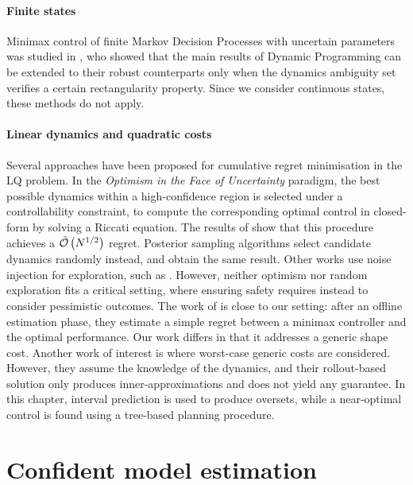 \paragraph{Finite states} Minimax control of finite Markov Decision Processes with uncertain parameters was studied in \citep{Iyengar2005,Nilim2005,Wiesemann2013}, who showed that the main results of Dynamic Programming can be extended to their robust counterparts only when the dynamics ambiguity set verifies a certain rectangularity property. Since we consider continuous states, these methods do not apply.

\paragraph{Linear dynamics and quadratic costs} Several approaches have been proposed for cumulative regret minimisation in the LQ problem. In the \emph{Optimism in the Face of Uncertainty} paradigm, the best possible dynamics within a high-confidence region is selected under a controllability constraint, to compute the corresponding optimal control in closed-form by solving a Riccati equation. The results of 	\citep{abbasi-yadkori11a,Ibrahimi2013,Faradonbeh2020} show that this procedure achieves a $\tilde{\mathcal{O}}\left(N^{1/2}\right)$ regret. Posterior sampling algorithms \citep{Ouyang2017,abeille18a} select candidate dynamics randomly instead, and obtain the same result. Other works use noise injection for exploration, such as \citep{Dean2019,Dean2018}. However, neither optimism nor random exploration fits a critical setting, where ensuring safety requires instead to consider pessimistic outcomes. The work of \citet{Dean2019} is close to our setting: after an offline estimation phase, they estimate a simple regret between a minimax controller and the optimal performance. Our work differs in that it addresses a generic shape cost. 
Another work of interest is \citep{Rosolia2019} where worst-case generic costs are considered. However, they assume the knowledge of the dynamics, and their rollout-based solution only produces inner-approximations and does not yield any guarantee. In this chapter, interval prediction is used to produce oversets, while a near-optimal control is found using a tree-based planning procedure.


\section{Confident model estimation}
\label{sec:estimation}


